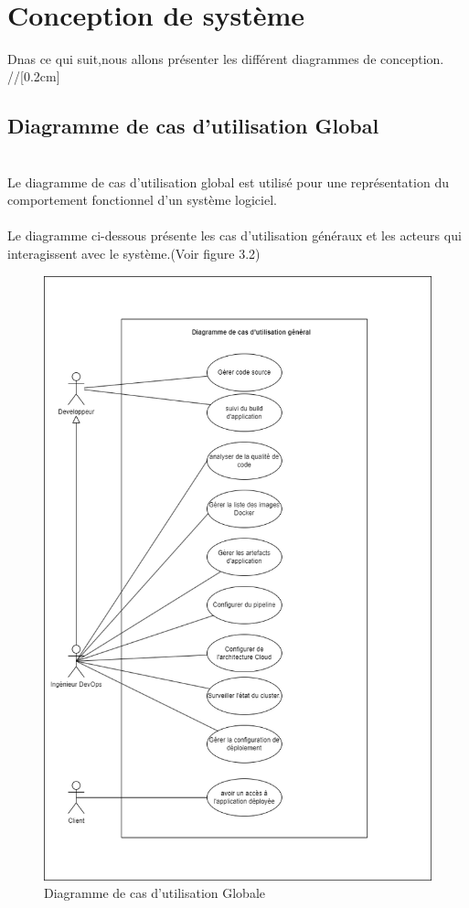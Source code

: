   \texttt{}\\[0.5cm]

\section{\LARGE  Conception de système}
\textsf{\selectfont{}
Dnas ce qui suit,nous allons présenter les différent diagrammes de conception. }//[0.2cm]
\subsection{\Large  Diagramme de cas d'utilisation Global}
\texttt{}\\[0.1cm]
\textsf{\selectfont{}
Le diagramme de cas d'utilisation global est utilisé pour une représentation du comportement fonctionnel d'un système logiciel.\\\texttt{}\\[0.01cm]
Le diagramme ci-dessous présente les cas d'utilisation généraux et les acteurs qui interagissent avec le système.(Voir figure 3.2)}
\begin{figure}[H]
  \begin{center}
  
      \includegraphics[width=12cm]{Use case.drawio.png}

  \end{center}
  
  \caption{Diagramme de cas d'utilisation Globale}
\end{figure}
